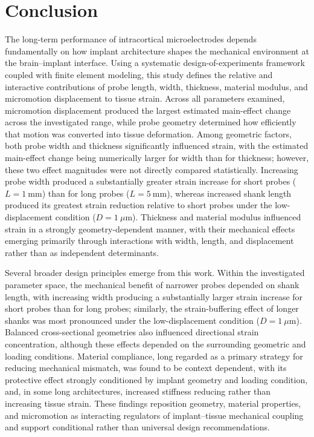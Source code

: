 \documentclass[fleqn,10pt]{wlscirep}
\begin{document}
\section{Conclusion}

The long-term performance of intracortical microelectrodes depends fundamentally on how implant architecture shapes the mechanical environment at the brain--implant interface. Using a systematic design-of-experiments framework coupled with finite element modeling, this study defines the relative and interactive contributions of probe length, width, thickness, material modulus, and micromotion displacement to tissue strain. Across all parameters examined, micromotion displacement produced the largest estimated main-effect change across the investigated range, while probe geometry determined how efficiently that motion was converted into tissue deformation. Among geometric factors, both probe width and thickness significantly influenced strain, with the estimated main-effect change being numerically larger for width than for thickness; however, these two effect magnitudes were not directly compared statistically. Increasing probe width produced a substantially greater strain increase for short probes ($L=1~\mathrm{mm}$) than for long probes ($L=5~\mathrm{mm}$), whereas increased shank length produced its greatest strain reduction relative to short probes under the low-displacement condition ($D=1~\mu\mathrm{m}$). Thickness and material modulus influenced strain in a strongly geometry-dependent manner, with their mechanical effects emerging primarily through interactions with width, length, and displacement rather than as independent determinants.

Several broader design principles emerge from this work. Within the investigated parameter space, the mechanical benefit of narrower probes depended on shank length, with increasing width producing a substantially larger strain increase for short probes than for long probes; similarly, the strain-buffering effect of longer shanks was most pronounced under the low-displacement condition ($D=1~\mu\mathrm{m}$). Balanced cross-sectional geometries also influenced directional strain concentration, although these effects depended on the surrounding geometric and loading conditions. Material compliance, long regarded as a primary strategy for reducing mechanical mismatch, was found to be context dependent, with its protective effect strongly conditioned by implant geometry and loading condition, and, in some long architectures, increased stiffness reducing rather than increasing tissue strain. These findings reposition geometry, material properties, and micromotion as interacting regulators of implant--tissue mechanical coupling and support conditional rather than universal design recommendations.
\end{document}
